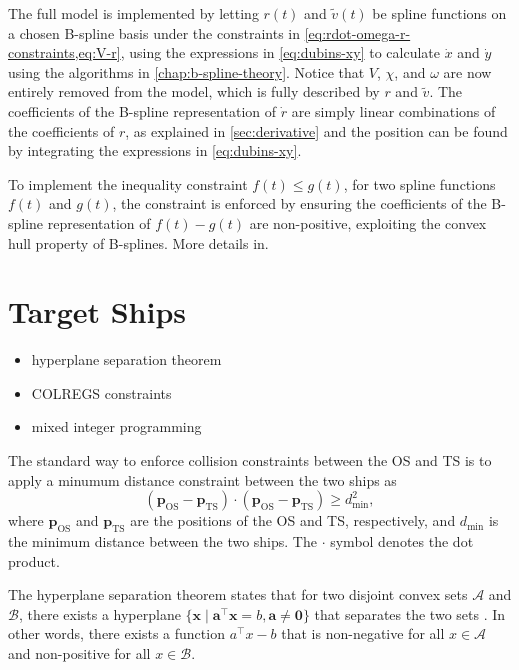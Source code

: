 The full model is implemented by letting $r(t)$ and $\tilde v(t)$ be spline functions on a chosen B-spline basis under the constraints in \cref{eq:rdot-omega-r-constraints,eq:V-r}, using the expressions in \cref{eq:dubins-xy} to calculate $\dot x$ and $\dot y$ using the algorithms in \cref{chap:b-spline-theory}. Notice that $V$, $\chi$, and $\omega$ are now entirely removed from the model, which is fully described by $r$ and $\tilde v$. The coefficients of the B-spline representation of $\dot r$ are simply linear combinations of the coefficients of $r$, as explained in \cref{sec:derivative} and the position can be found by integrating the expressions in \cref{eq:dubins-xy}.

To implement the inequality constraint $f(t) \le g(t)$, for two spline functions $f(t)$ and $g(t)$, the constraint is enforced by ensuring the coefficients of the B-spline representation of $f(t) - g(t)$ are non-positive, exploiting the convex hull property of B-splines.
More details in.

\section{Target Ships}
\begin{itemize}
    \item hyperplane separation theorem
    \item COLREGS constraints
    \item mixed integer programming
\end{itemize}

The standard way to enforce collision constraints between the OS and TS is to apply a minumum distance constraint between the two ships as
\begin{equation}\label{eq:minimum-distance}
    (\mathbf p_{\text{OS}} - \mathbf p_{\text{TS}}) \cdot (\mathbf p_{\text{OS}} - \mathbf p_{\text{TS}}) \geq d_{\text{min}}^2,
\end{equation}
where $\mathbf p_{\text{OS}}$ and $\mathbf p_{\text{TS}}$ are the positions of the OS and TS, respectively, and $d_{\text{min}}$ is the minimum distance between the two ships. The $\cdot$ symbol denotes the dot product. 

The hyperplane separation theorem states that for two disjoint convex sets $\mathcal A$ and $\mathcal B$, there exists a hyperplane $\{\mathbf x \mid \mathbf a^\top \mathbf x = b, \mathbf a\ne \mathbf 0\}$ that separates the two sets \citep{Boyd2004-ih}. In other words, there exists a function $a^\top x - b$ that is non-negative for all $x \in \mathcal A$ and non-positive for all $x \in \mathcal B$. 

